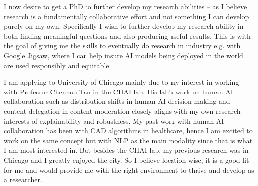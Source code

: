 \documentclass[12pt]{article}
\begin{document}
I now desire to get a PhD to further develop my research abilities -- as I believe research is a fundamentally collaborative effort and not something I can develop purely on my own. Specifically I wish to further develop my research ability in both finding meaningful questions and also producing useful results. This is with the goal of giving me the skills to eventually do research in industry e.g. with Google Jigsaw, where I can help insure AI models being deployed in the world are used responsibly and equitable.

I am applying to University of Chicago mainly due to my interest in working with Professor Chenhao Tan in the CHAI lab. His lab's work on human-AI collaboration such as distribution shifts in human-AI decision making \cite{liu2021understanding} and content delegation in content moderation \cite{lai2022human} closely aligns with my own research interests of explainability and robustness. My past work with human-AI collaboration has been with CAD algorithms in healthcare, hence I am excited to work on the same concept but with NLP as the main modality since that is what I am most interested in.
But besides the CHAI lab, my previous research was in Chicago and I greatly enjoyed the city. So I believe location wise, it is a good fit for me and would provide me with the right environment to thrive and develop as a researcher.%







\end{document}
